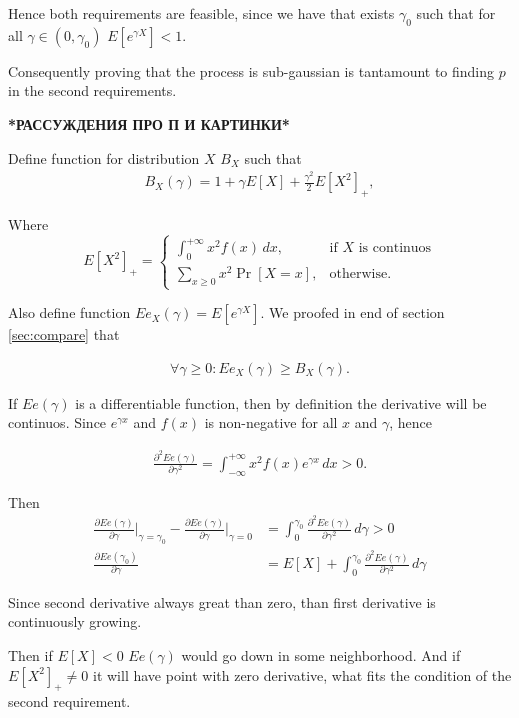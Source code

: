 \documentclass[12pt, a4paper]{article}
\theoremstyle{remark}
\newcommand{\infint}[1]{\int_{-\infty}^{+\infty} #1 \, dx}
\newcommand{\der}[2]{\frac{\partial #1}{\partial #2}}
\begin{document}
Hence both requirements are feasible, since we have that exists \(\gamma_0\) such that for all \(\gamma \in (0, \gamma_0)\) $E[e^{\gamma X}] < 1.$

Consequently proving that the process is sub-gaussian is tantamount to finding $p$ in the second requirements.

\hfill

\textbf{*РАССУЖДЕНИЯ ПРО П И КАРТИНКИ*}

\hfill

Define function for distribution $X$ $B_X$ such that
\begin{align*}
    B_X(\gamma) = 1 + \gamma E[X] + \frac{\gamma^2}{2} E[X^2]_+,
\end{align*}

Where
\[
E[X^2]_+= 
\begin{cases}
    \int_0^{+\infty} x^2 f(x)\, dx,& \text{if $X$ is continuos}\\
    \sum_{x \geq 0} x^2 \Pr[X = x],              & \text{otherwise}.
\end{cases}
\]

Also define function $Ee_X(\gamma) = E[e^{\gamma X}]$. We proofed in end of section \ref*{sec:compare} that

\begin{align*}
    \forall \gamma\geq 0: Ee_X(\gamma) \geq B_X(\gamma).
\end{align*}

If $Ee(\gamma)$ is a differentiable function, then by definition the derivative will be continuos. Since $e^{\gamma x}$ and $f(x)$ is non-negative for all $x$ and $\gamma$, hence

\begin{align*}
    \frac{\partial^2 Ee(\gamma)}{\partial\gamma^2} = \infint{x^2 f(x) e^{\gamma x}} > 0.
\end{align*}

Then
\begin{align*}
    \der{Ee(\gamma)}{\gamma} \Big|_{\gamma = \gamma_0} - \der{Ee(\gamma)}{\gamma}\Big|_{\gamma = 0} &= \int_0^{\gamma_0} \frac{\partial^2 Ee(\gamma)}{\partial\gamma^2}\, d\gamma > 0 \\
    \der{Ee\left(\gamma_0\right)}{\gamma} &= E[X] + \int_0^{\gamma_0} \frac{\partial^2 Ee(\gamma)}{\partial\gamma^2}\, d\gamma
\end{align*}

Since second derivative always great than zero, than first derivative is continuously growing.

Then if $E[X] < 0$ $Ee(\gamma)$ would go down in some neighborhood. And if $E[X^2]_+ \neq 0$ it will have point with zero derivative, what fits the condition of the second requirement.
\end{document}

